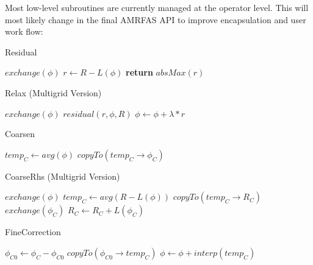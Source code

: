 \documentclass[12pt,a4paper]{article}
\begin{document}
Most low-level subroutines are currently managed at the operator level. This will most likely change in the final AMRFAS API to improve encapsulation and user work flow:

\begin{algorithm}
\caption{Residual}
\begin{algorithmic}[1]
\State $exchange(\phi)$
\State $r \gets R - L(\phi)$
\State \textbf{return} $absMax(r)$
\EndProcedure
\end{algorithmic}
\end{algorithm}

\begin{algorithm}
\caption{Relax (Multigrid Version)}
\begin{algorithmic}[1]
	\State $exchange(\phi)$
	\State $residual(r, \phi, R)$
	\State $\phi \gets \phi + \lambda * r$
\EndFor
\EndProcedure
\end{algorithmic}
\end{algorithm}

\begin{algorithm}
\caption{Coarsen}
\begin{algorithmic}[1]
\State $temp_C \gets avg(\phi)$
\State $copyTo(temp_C\rightarrow\phi_C)$
\EndProcedure
\end{algorithmic}
\end{algorithm}

\begin{algorithm}
\caption{CoarseRhs (Multigrid Version)}
\begin{algorithmic}[1]
\State $exchange(\phi)$
\State $temp_C \gets avg(R - L(\phi))$
\State $copyTo(temp_C\rightarrow R_C)$
\State $exchange(\phi_C)$
\State $R_C \gets R_C + L(\phi_C)$
\EndProcedure
\end{algorithmic}
\end{algorithm}

\begin{algorithm}
\caption{FineCorrection}
\begin{algorithmic}[1]
\State $\phi_{C0} \gets \phi_C - \phi_{C0}$
\State $copyTo(\phi_{C0}\rightarrow temp_C)$
\State $\phi \gets \phi + interp(temp_C)$
\EndProcedure
\end{algorithmic}
\end{algorithm}
\end{document}
